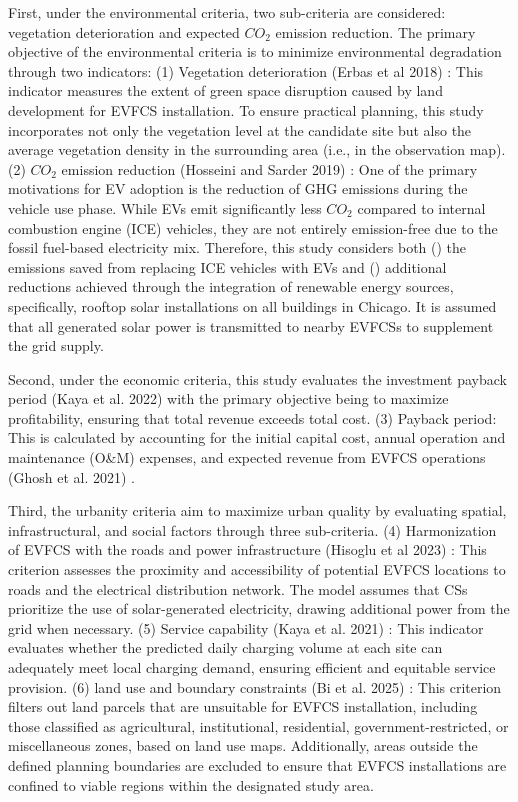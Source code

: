 \documentclass[preprint,12pt]{elsarticle}
\begin{document}
First, under the environmental criteria, two sub-criteria are considered: vegetation deterioration and expected $CO_2$ emission reduction. The primary objective of the environmental criteria is to minimize environmental degradation through two indicators:
(1) Vegetation deterioration (Erbas et al 2018) \cite{Erbas2018}: This indicator measures the extent of green space disruption caused by land development for EVFCS installation. To ensure practical planning, this study incorporates not only the vegetation level at the candidate site but also the average vegetation density in the surrounding area (i.e., in the observation map). 
(2) $CO_2$ emission reduction (Hosseini and Sarder 2019) \cite{Hosseini2019}: One of the primary motivations for EV adoption is the reduction of GHG emissions during the vehicle use phase. While EVs emit significantly less $CO_2$ compared to internal combustion engine (ICE) vehicles, they are not entirely emission-free due to the fossil fuel-based electricity mix. Therefore, this study considers both () the emissions saved from replacing ICE vehicles with EVs and () additional reductions achieved through the integration of renewable energy sources, specifically, rooftop solar installations on all buildings in Chicago. It is assumed that all generated solar power is transmitted to nearby EVFCSs to supplement the grid supply. 

Second, under the economic criteria, this study evaluates the investment payback period (Kaya et al. 2022) \cite{kaya_alemdar2022} with the primary objective being to maximize profitability, ensuring that total revenue exceeds total cost. 
(3) Payback period: This is calculated by accounting for the initial capital cost, annual operation and maintenance (O\&M) expenses, and expected revenue from EVFCS operations (Ghosh et al. 2021) \cite{Ghosh2021}. 

Third, the urbanity criteria aim to maximize urban quality by evaluating spatial, infrastructural, and social factors through three sub-criteria.
(4) Harmonization of EVFCS with the roads and power infrastructure (Hisoglu et al 2023) \cite{Hisoglu2023}: This criterion assesses the proximity and accessibility of potential EVFCS locations to roads and the electrical distribution network. The model assumes that CSs prioritize the use of solar-generated electricity, drawing additional power from the grid when necessary. 
(5) Service capability (Kaya et al. 2021) \cite{Kaya_Alem2021}: This indicator evaluates whether the predicted daily charging volume at each site can adequately meet local charging demand, ensuring efficient and equitable service provision.
(6) land use and boundary constraints (Bi et al. 2025) \cite{Bi2025}: This criterion filters out land parcels that are unsuitable for EVFCS installation, including those classified as agricultural, institutional, residential, government-restricted, or miscellaneous zones, based on land use maps. Additionally, areas outside the defined planning boundaries are excluded to ensure that EVFCS installations are confined to viable regions within the designated study area. 
\end{document}
